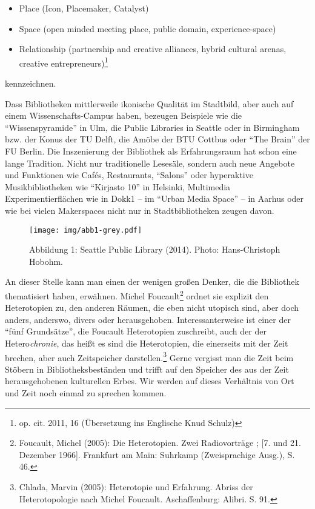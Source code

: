 \begin{flushleft}
\begin{itemize}
\item
  Place (Icon, Placemaker, Catalyst)
\item
  Space (open minded meeting place, public domain, experience-space)
\item
  Relationship (partnership and creative alliances, hybrid cultural
  arenas, creative entrepreneurs)\footnote{op. cit. 2011, 16 (Übersetzung
    ins Englische Knud Schulz)}
\end{itemize}
\end{flushleft}

kennzeichnen.

Dass Bibliotheken mittlerweile ikonische Qualität im Stadtbild, aber
auch auf einem Wissenschafts-Campus haben, bezeugen Beispiele wie die
\enquote{Wissenspyramide} in Ulm, die Public Libraries in Seattle oder
in Birmingham bzw. der Konus der TU Delft, die Amöbe der BTU Cottbus
oder \enquote{The Brain} der FU Berlin. Die Inszenierung der Bibliothek
als Erfahrungsraum hat schon eine lange Tradition. Nicht nur
traditionelle Lesesäle, sondern auch neue Angebote und Funktionen wie
Cafés, Restaurants, \enquote{Salons} oder hyperaktive Musikbibliotheken
wie \enquote{Kirjasto 10} in Helsinki, Multimedia Experimentierflächen
wie in Dokk1 -- im \enquote{Urban Media Space} -- in Aarhus oder wie bei
vielen Makerspaces nicht nur in Stadtbibliotheken zeugen davon.

\begin{figure}[htbp]
\centering
\texttt{[image: img/abb1-grey.pdf]}
\caption*{Abbildung 1: Seattle Public Library (2014). Photo: Hans-Christoph Hobohm.}
\end{figure}

An dieser Stelle kann man einen der wenigen großen Denker, die die
Bibliothek thematisiert haben, erwähnen. Michel Foucault\footnote{Foucault,
  Michel (2005): Die Heterotopien. Zwei Radiovorträge ; {[}7. und 21.
  Dezember 1966{]}. Frankfurt am Main: Suhrkamp (Zweisprachige Ausg.),
  S. 46.} ordnet sie explizit den Heterotopien zu, den anderen Räumen,
die eben nicht utopisch sind, aber doch anders, anderswo, divers oder
herausgehoben. Interessanterweise ist einer der \enquote{fünf
Grundsätze}, die Foucault Heterotopien zuschreibt, auch der der
Hetero\emph{chronie}, das heißt es sind die Heterotopien, die einerseits
mit der Zeit brechen, aber auch Zeitspeicher darstellen.\footnote{Chlada,
  Marvin (2005): Heterotopie und Erfahrung. Abriss der Heterotopologie
  nach Michel Foucault. Aschaffenburg: Alibri. S. 91.} Gerne vergisst
man die Zeit beim Stöbern in Bibliotheksbeständen und trifft auf den
Speicher des aus der Zeit herausgehobenen kulturellen Erbes. Wir werden
auf dieses Verhältnis von Ort und Zeit noch einmal zu sprechen kommen.

